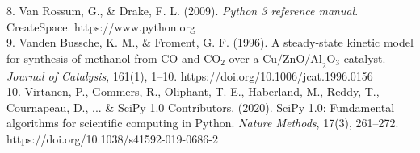 \documentclass[12pt]{article}
\begin{document}
\begin{tcolorbox}[
    enhanced,
    colback=primaryblue,
    colframe=pyyellow,
    boxrule=3.5pt,
    arc=8pt,
    top=16pt,
    bottom=16pt,
    left=22pt,
    right=22pt
]
\begin{minipage}[t]{0.495\linewidth}
        \hangindent=18pt 
        8. Van Rossum, G., \& Drake, F. L. (2009). \textit{Python 3 reference manual}. CreateSpace. https://www.python.org\\[6pt]
        \hangindent=18pt 
        9. Vanden Bussche, K. M., \& Froment, G. F. (1996). A steady-state kinetic model for synthesis of methanol from $\text{CO}$ and $\text{CO}_2$ over a $\text{Cu/ZnO/Al}_2\text{O}_3$ catalyst. \textit{Journal of Catalysis}, 161(1), 1--10. https://doi.org/10.1006/jcat.1996.0156\\[6pt]
        \hangindent=18pt 
        10. Virtanen, P., Gommers, R., Oliphant, T. E., Haberland, M., Reddy, T., Cournapeau, D., ... \& SciPy 1.0 Contributors. (2020). SciPy 1.0: Fundamental algorithms for scientific computing in Python. \textit{Nature Methods}, 17(3), 261--272. https://doi.org/10.1038/s41592-019-0686-2
    \end{minipage}
\end{tcolorbox}
\end{document}
